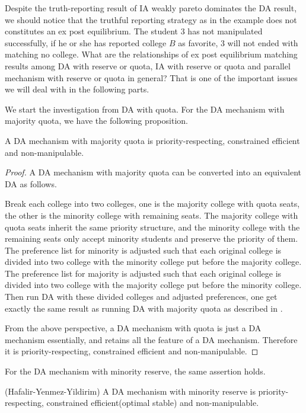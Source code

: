 Despite the truth-reporting result of IA weakly pareto dominates the DA result, we should notice that the truthful reporting strategy as in the example does not constitutes an ex post equilibrium. The student $3$ has not manipulated successfully, if he or she has reported college $B$ as favorite, $3$ will not ended with matching no college. What are the relationships of ex post equilibrium matching results among DA with reserve or quota, IA with reserve or quota and parallel mechanism with reserve or quota in general? That is one of the important issues we will deal with in the following parts.

We start the investigation from DA with quota. For the DA mechanism with majority quota, we have the following proposition.

\begin{prop}
A DA mechanism with majority quota is priority-respecting, constrained efficient and non-manipulable.
\end{prop}
\begin{proof}
  A DA mechanism with majority quota can be  converted into an equivalent DA as follows.

  Break each college into two colleges, one is the majority college with quota seats, the other is the minority college with remaining seats. The majority college with quota seats inherit the same priority structure, and the minority college with the remaining seats only accept minority students and preserve the priority of them. The preference list for minority is adjusted such that each original college is divided into two college with the minority college put before the majority college.  The preference list for majority is adjusted such that each original college is divided into two college with the majority college put before the minority college. Then run DA with these divided colleges and adjusted preferences, one get exactly the same result as running DA with majority quota as described in \parencite{Kojima2012}.

  From the above perspective, a DA mechanism with quota is just a DA mechanism essentially, and retains all the feature of a DA mechanism. Therefore it is priority-respecting, constrained efficient and non-manipulable.
\end{proof}

For the DA mechanism with minority reserve, the same assertion holds.

\begin{prop*}(Hafalir-Yenmez-Yildirim)
  A DA mechanism with minority reserve is priority-respecting, constrained efficient(optimal stable) and non-manipulable.
\end{prop*}

